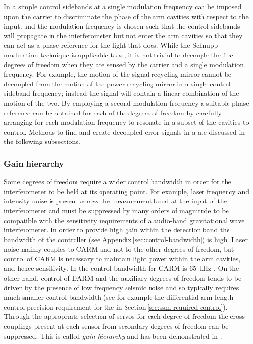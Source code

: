 In a simple \MI{} control sidebands at a single modulation frequency can be imposed upon the carrier to discriminate the phase of the arm cavities with respect to the input, and the modulation frequency is chosen such that the control sidebands will propagate in the interferometer but not enter the arm cavities so that they can act as a phase reference for the light that does. While the Schnupp modulation technique is applicable to \DRFPMI{}s \cite{Heinzel1998}, it is not trivial to decouple the five degrees of freedom when they are sensed by the carrier and a single modulation frequency. For example, the motion of the signal recycling mirror cannot be decoupled from the motion of the power recycling mirror in a single control sideband frequency; instead the signal will contain a linear combination of the motion of the two. By employing a second modulation frequency a suitable phase reference can be obtained for each of the degrees of freedom by carefully arranging for each modulation frequency to resonate in a subset of the cavities to control. Methods to find and create decoupled error signals in a \DRFPMI{} are discussed in the following subsections.

\subsubsection{\label{sec:drfpmi-gain-hierarchy}Gain hierarchy}
Some degrees of freedom require a wider control bandwidth in order for the interferometer to be held at its operating point. For example, laser frequency and intensity noise is present across the measurement band at the input of the interferometer and must be suppressed by many orders of magnitude to be compatible with the sensitivity requirements of a audio-band gravitational wave interferometer. In order to provide high gain within the detection band the bandwidth of the controller (see Appendix\,\ref{sec:control-bandwidth}) is high. Laser noise mainly couples to \gls{CARM} and not to the other degrees of freedom, but control of \gls{CARM} is necessary to maintain light power within the arm cavities, and hence sensitivity. In \ALIGO{} the control bandwidth for \gls{CARM} is \SI{65}{\kilo\hertz} \cite{Abbott2010}. On the other hand, control of \gls{DARM} and the auxiliary degrees of freedom tends to be driven by the presence of low frequency seismic noise and so typically requires much smaller control bandwidth (see for example the differential arm length control precision requirement for the \SSMEXPT{} in Section\,\ref{sec:ssm-required-control}). Through the appropriate selection of servos for each degree of freedom the cross-couplings present at each sensor from secondary degrees of freedom can be suppressed. This is called \emph{gain hierarchy} and has been demonstrated in \LIGO{} \cite{Fritschel2001}.

